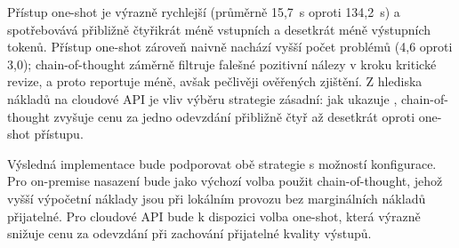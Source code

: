 Přístup one-shot je výrazně rychlejší (průměrně 15,7~s oproti 134,2~s) a spotřebovává přibližně čtyřikrát méně vstupních a desetkrát méně výstupních tokenů.
Přístup one-shot zároveň naivně nachází vyšší počet problémů (4,6 oproti 3,0); chain-of-thought záměrně filtruje falešné pozitivní nálezy v kroku kritické revize, a proto reportuje méně, avšak pečlivěji ověřených zjištění.
Z hlediska nákladů na cloudové API je vliv výběru strategie zásadní: jak ukazuje , chain-of-thought zvyšuje cenu za jedno odevzdání přibližně čtyř až desetkrát oproti one-shot přístupu.

Výsledná implementace bude podporovat obě strategie s možností konfigurace.
Pro on-premise nasazení bude jako výchozí volba použit chain-of-thought, jehož vyšší výpočetní náklady jsou při lokálním provozu bez marginálních nákladů přijatelné.
Pro cloudové API bude k dispozici volba one-shot, která výrazně snižuje cenu za odevzdání při zachování přijatelné kvality výstupů.

\endinput